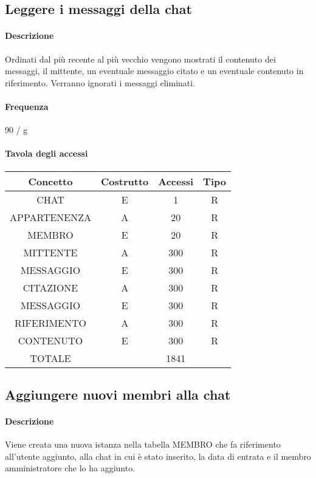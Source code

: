 \documentclass[a4paper,12pt]{report}
\begin{document}
\subsection{Leggere i messaggi della chat} \label{leggere_messaggi}
\paragraph{Descrizione} Ordinati dal più recente al più vecchio vengono mostrati il contenuto dei messaggi, il mittente, un eventuale messaggio citato e un eventuale contenuto in riferimento. Verranno ignorati i messaggi eliminati.
\paragraph{Frequenza} 90 / g
\begin{table}[H]
\paragraph{Tavola degli accessi\newline}
\begin{tabular}{|c|c|c|c|}
\hline
Concetto     & Costrutto & Accessi & Tipo \\ \hline
CHAT         & E         & 1       & R    \\ \hline
APPARTENENZA & A         & 20      & R    \\ \hline
MEMBRO       & E         & 20      & R    \\ \hline
MITTENTE     & A         & 300     & R    \\ \hline
MESSAGGIO    & E         & 300     & R    \\ \hline
CITAZIONE    & A         & 300     & R    \\ \hline
MESSAGGIO    & E         & 300     & R    \\ \hline
RIFERIMENTO  & A         & 300     & R    \\ \hline
CONTENUTO    & E         & 300     & R    \\ \hline
TOTALE       &           & 1841    &      \\ \hline
\end{tabular}
\end{table}
\subsection{Aggiungere nuovi membri alla chat} \label{aggiungere_membri}
\paragraph{Descrizione} Viene creata una nuova istanza nella tabella MEMBRO che fa riferimento all'utente aggiunto, alla chat in cui è stato inserito, la data di entrata e il membro amministratore che lo ha aggiunto.
\end{document}
